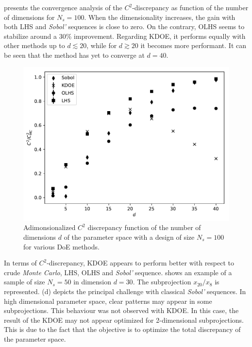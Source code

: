  presents the convergence analysis of the $C^2$-discrepancy as function of the number of dimensions for $N_s = 100$. When the dimensionality increases, the gain with both LHS and \emph{Sobol'} sequences is close to zero. On the contrary, OLHS seems to stabilize around a 30\% improvement. Regarding KDOE, it performs equally with other methods up to $d \lesssim 20$, while for $d \gtrsim 20$ it becomes more performant. It can be seen that the method has yet to converge at $d = 40$.

\begin{figure}[!ht]
\centering
\includegraphics[width=0.9\linewidth,keepaspectratio]{fig/contributions/doe/kde_dim.pdf}
\caption{Adimonsionalized $C^2$ discrepancy function of the number of dimensions $d$ of the parameter space with a design of size $N_s = 100$ for various DoE methods.}
\label{fig:conv-dim-100}
\end{figure}

In terms of $C^2$-discrepancy, KDOE appears to perform better with respect to crude \emph{Monte Carlo}, LHS, OLHS and \emph{Sobol'} sequence.  shows an example of a sample of size $N_s = 50$ in dimension $d=30$. The subprojection $x_{20}/x_8$ is represented. (d) depicts the principal challenge with classical \emph{Sobol'} sequences. In high dimensional parameter space, clear patterns may appear in some subprojections. This behaviour was not observed with KDOE. In this case, the result of the KDOE may not appear optimized for 2-dimensional subprojections. This is due to the fact that the objective is to optimize the total discrepancy of the parameter space.

